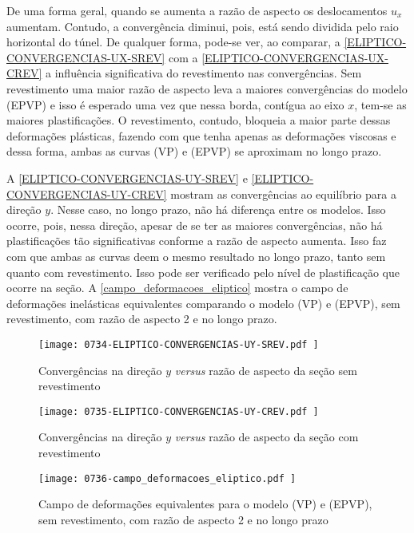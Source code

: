 De uma forma geral, quando se aumenta a razão de aspecto os deslocamentos $u_x$ aumentam. Contudo, a convergência diminui, pois, está sendo dividida pelo raio horizontal do túnel. De qualquer forma, pode-se ver, ao comparar, a \autoref{ELIPTICO-CONVERGENCIAS-UX-SREV} com a \autoref{ELIPTICO-CONVERGENCIAS-UX-CREV} a influência significativa do revestimento nas convergências. Sem revestimento uma maior razão de aspecto leva a maiores convergências do modelo (EPVP) e isso é esperado uma vez que nessa borda, contígua ao eixo $x$, tem-se as maiores plastificações. O revestimento, contudo, bloqueia a maior parte dessas deformações plásticas, fazendo com que tenha apenas as deformações viscosas e dessa forma, ambas as curvas (VP) e (EPVP) se aproximam no longo prazo. 

A \autoref{ELIPTICO-CONVERGENCIAS-UY-SREV} e \autoref{ELIPTICO-CONVERGENCIAS-UY-CREV} mostram as convergências ao equilíbrio para a direção $y$. Nesse caso, no longo prazo, não há diferença entre os modelos. Isso ocorre, pois, nessa direção, apesar de se ter as maiores convergências, não há plastificações tão significativas conforme a razão de aspecto aumenta. Isso faz com que ambas as curvas deem o mesmo resultado no longo prazo, tanto sem quanto com revestimento. Isso pode ser verificado pelo nível de plastificação que ocorre na seção. A \autoref{campo_deformacoes_eliptico} mostra o campo de deformações inelásticas equivalentes comparando o modelo (VP) e (EPVP), sem revestimento, com razão de aspecto 2 e no longo prazo.

\begin{figure}[H]
	\begin{center}
		\texttt{[image: 0734-ELIPTICO-CONVERGENCIAS-UY-SREV.pdf
		]}
	\end{center}
	\caption{\label{ELIPTICO-CONVERGENCIAS-UY-SREV}Convergências na direção $y$ \textit{versus} razão de aspecto da seção sem revestimento}
\end{figure}

\begin{figure}[H]
	\begin{center}
		\texttt{[image: 0735-ELIPTICO-CONVERGENCIAS-UY-CREV.pdf
		]}
	\end{center}
	\caption{\label{ELIPTICO-CONVERGENCIAS-UY-CREV}Convergências na direção $y$ \textit{versus} razão de aspecto da seção com revestimento}
\end{figure}

\begin{figure}[H]
	\begin{center}
		\texttt{[image: 0736-campo\_deformacoes\_eliptico.pdf
		]}
	\end{center}
	\caption{\label{campo_deformacoes_eliptico}Campo de deformações equivalentes para o modelo (VP) e (EPVP), sem revestimento, com razão de aspecto 2 e no longo prazo}
\end{figure}

